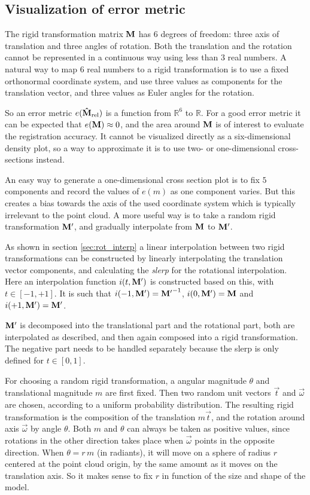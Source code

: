 \subsection{Visualization of error metric} \label{sec:err_vis}
The rigid transformation matrix $\mathbf{M}$ has $6$ degrees of freedom: three axis of translation and three angles of rotation. Both the translation and the rotation cannot be represented in a continuous way using less than $3$ real numbers. A natural way to map $6$ real numbers to a rigid transformation is to use a fixed orthonormal coordinate system, and use three values as components for the translation vector, and three values as Euler angles for the rotation.

So an error metric $e(\mathbf{\hat{M}}_{\text{rel}})$ is a function from $\mathbb{R}^6$ to $\mathbb{R}$. For a good error metric it can be expected that $e(\mathbf{M}) \approx 0$, and the area around $\mathbf{M}$ is of interest to evaluate the registration accuracy. It cannot be visualized directly as a six-dimensional density plot, so a way to approximate it is to use two- or one-dimensional cross-sections instead.

An easy way to generate a one-dimensional cross section plot is to fix $5$ components and record the values of $e(m)$ as one component varies. But this creates a bias towards the axis of the used coordinate system which is typically irrelevant to the point cloud. A more useful way is to take a random rigid transformation $\mathbf{M'}$, and gradually interpolate from $\mathbf{M}$ to $\mathbf{M'}$.

As shown in section \ref{sec:rot_interp} a linear interpolation between two rigid transformations can be constructed by linearly interpolating the translation vector components, and calculating the \emph{slerp} for the rotational interpolation. Here an interpolation function $i(t, \mathbf{M'})$ is constructed based on this, with $t \in [-1, +1]$. It is such that $i(-1, \mathbf{M'}) = \mathbf{M'}^{-1}$, $i(0, \mathbf{M'}) = \mathbf{M}$ and $i(+1, \mathbf{M'}) = \mathbf{M'}$.

$\mathbf{M'}$ is decomposed into the translational part and the rotational part, both are interpolated as described, and then again composed into a rigid transformation. The negative part needs to be handled separately because the slerp is only defined for $t \in [0, 1]$.

For choosing a random rigid transformation, a angular magnitude $\theta$ and translational magnitude $m$ are first fixed. Then two random unit vectors $\vec{t}$ and $\vec{\omega}$ are chosen, according to a uniform probability distribution. The resulting rigid transformation is the composition of the translation $m \vec{t}$, and the rotation around axis $\vec{\omega}$ by angle $\theta$. Both $m$ and $\theta$ can always be taken as positive values, since rotations in the other direction takes place when $\vec{\omega}$ points in the opposite direction. When $\theta = r \, m$ (in radiants), it will move on a sphere of radius $r$ centered at the point cloud origin, by the same amount as it moves on the translation axis. So it makes sense to fix $r$ in function of the size and shape of the model.


